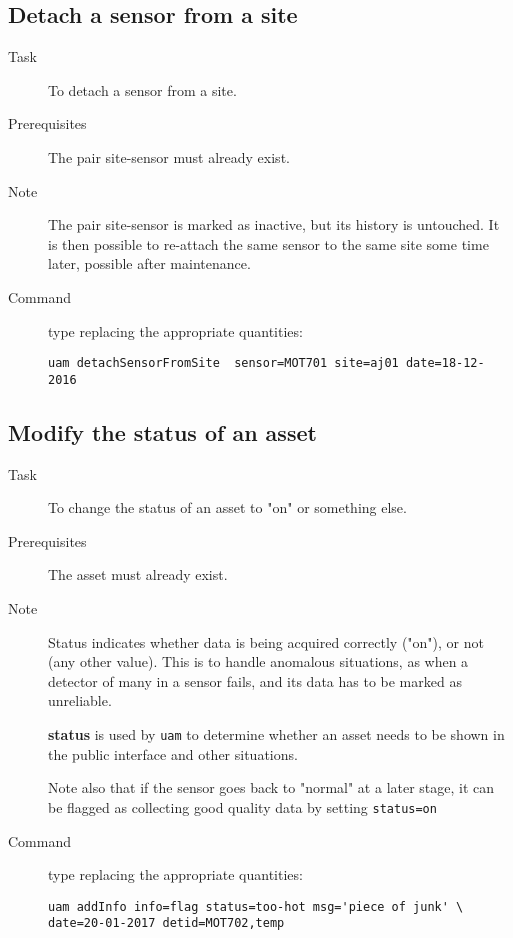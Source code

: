 \documentclass[12pt]{amsart}
\begin{document}
\subsection{Detach a sensor from a site}
\begin{description}
\item[Task] To detach a sensor from a site.

\item[Prerequisites] The pair site-sensor must already exist.

\item[Note] The pair site-sensor is marked as inactive, but its history is untouched. It is then possible to re-attach the same sensor to the same site some time later, possible after maintenance.

\item[Command] type replacing the appropriate quantities:

\begin{verbatim}
uam detachSensorFromSite  sensor=MOT701 site=aj01 date=18-12-2016
\end{verbatim}

\end{description}


\subsection{Modify the status of an asset}
\begin{description}
\item[Task] To change the status of an asset to "on" or something else.

\item[Prerequisites] The asset must already exist.

\item[Note] Status indicates whether data is being acquired correctly ("on"), or not (any other value). This is to handle anomalous situations, as when a detector of many in a sensor fails, and its data has to be marked as unreliable.

{\bf status} is used by {\tt uam} to determine whether an asset needs to be shown in the public interface and other situations.

Note also that if the sensor goes back to "normal" at a later stage, it can be flagged as collecting good quality data by setting {\tt status=on} 

\item[Command] type replacing the appropriate quantities:

\begin{verbatim}
uam addInfo info=flag status=too-hot msg='piece of junk' \
date=20-01-2017 detid=MOT702,temp
\end{verbatim}

\end{description}
\end{document}

